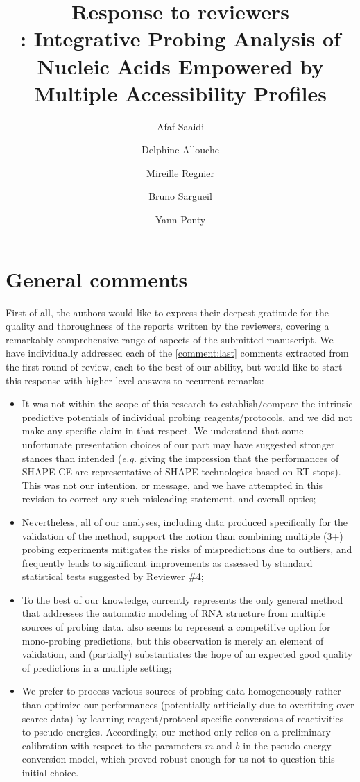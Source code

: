 \documentclass[9pt,hyperref]{article} %
\title{Response to reviewers\\[.3em]\OurTool{}:  Integrative Probing Analysis of Nucleic Acids Empowered by Multiple Accessibility Profiles}
\author{
Afaf Saaidi \and
Delphine Allouche \and
Mireille Regnier \and
Bruno Sargueil \and
Yann Ponty}
\date{} %
\begin{document}
\maketitle

\tableofcontents

\section{General comments}

	
First of all, the authors would like to express their deepest gratitude for the quality and thoroughness of the reports written by the reviewers, covering a remarkably comprehensive range of aspects of the submitted manuscript. We have individually addressed each of the \ref{comment:last} comments extracted from the first round of review, each to the best of our ability, but would like to start this response with higher-level answers to recurrent remarks:
\begin{itemize}
	\item It was not within the scope of this research to establish/compare the intrinsic predictive potentials of individual probing reagents/protocols, and we did not make any specific claim in that respect. We understand that some unfortunate presentation choices of  our part may have suggested stronger stances than intended (\emph{e.g.} giving the impression that the performances of SHAPE CE are representative of SHAPE technologies based on RT stops). This was not our intention, or message, and we have attempted in this revision  to correct any such misleading statement, and overall optics;
	\item Nevertheless, all of our analyses, including data produced specifically for the validation of the method, support the notion than combining multiple (3+) probing experiments mitigates the risks of mispredictions due to outliers, and frequently leads to significant improvements as assessed by standard statistical tests suggested by Reviewer \#4;
	\item To the best of our knowledge, \OurTool currently represents the only general method that addresses the automatic modeling of RNA structure from multiple sources of probing data. \OurTool also seems to represent a competitive option for mono-probing predictions, but this observation is merely an element of validation, and (partially) substantiates the hope of an expected good quality of predictions in a multiple setting;
	\item We prefer to process various sources of probing data homogeneously rather than optimize our performances (potentially artificially due to overfitting over scarce data) by learning reagent/protocol specific conversions of reactivities to pseudo-energies. Accordingly, our method only relies on a preliminary calibration with respect to the parameters $m$ and $b$ in the \cite{Deigan2009} pseudo-energy conversion model, which proved robust enough for us not to question this initial choice.
\end{itemize}
\end{document}

